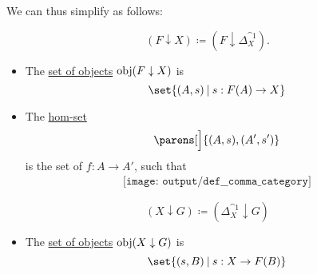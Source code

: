 \begin{definition}
\begin{thmenum}
    We can thus simplify  as follows:

    \begin{minipage}[t]{0.43\textwidth}
      \begin{equation*}
        (F \downarrow X) \coloneqq (F \downarrow \Delta_X^{\cat{1}}).
      \end{equation*}

      \begin{itemize}
        \item The \hyperref[def:category/objects]{set of objects} \( \operatorname{obj}(F \downarrow X) \) is
        \begin{equation*}
          \set{ (A, s) \given s: F(A) \to X }
        \end{equation*}

        \item The \hyperref[def:category/morphisms]{hom-set}
        \begin{equation*}
          [F \downarrow X]\parens[\Big]{ (A, s), (A', s') }
        \end{equation*}
        is the set of \( f: A \to A' \), such that
        \begin{equation}\label{eq:def:comma_category/fixed/right}
          \begin{aligned}
            \texttt{[image: output/def\_\_comma\_category]}
          \end{aligned}
        \end{equation}
      \end{itemize}
    \end{minipage}
    \begin{minipage}[t]{0.43\textwidth}
      \begin{equation*}
        (X \downarrow G) \coloneqq (\Delta_X^{\cat{1}} \downarrow G)
      \end{equation*}

      \begin{itemize}
        \item The \hyperref[def:category/objects]{set of objects} \( \operatorname{obj}(X \downarrow G) \) is
        \begin{equation*}
          \set{ (s, B) \given s: X \to F(B) }
        \end{equation*}


\end{itemize}
\end{minipage}
\end{thmenum}
\end{definition}
